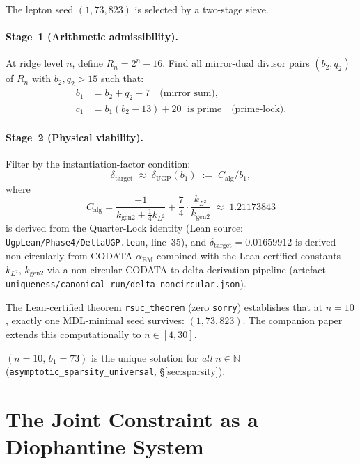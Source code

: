\documentclass[11pt]{article}
\theoremstyle{remark}
\newcommand{\bone}{b_1}
\newcommand{\btwo}{b_2}
\newcommand{\qtwo}{q_2}
\newcommand{\cone}{c_1}
\newcommand{\deltaNUGP}{\delta_{\mathrm{UGP}}}
\newcommand{\deltatar}{\delta_{\mathrm{target}}}
\newcommand{\Calg}{C_{\mathrm{alg}}}
\begin{document}
The lepton seed $(1, 73, 823)$ is selected by a two-stage sieve.

\paragraph{Stage~1 (Arithmetic admissibility).}
At ridge level $n$, define $R_n = 2^n - 16$.
Find all mirror-dual divisor pairs $(\btwo, \qtwo)$ of $R_n$ with $\btwo, \qtwo > 15$ such that:
\begin{align}
  \bone &= \btwo + \qtwo + 7 \quad \text{(mirror sum)}, \label{eq:s1_mirror} \\
  \cone &= \bone(\btwo - 13) + 20 \;\text{ is prime} \quad \text{(prime-lock)}. \label{eq:s1_prime}
\end{align}

\paragraph{Stage~2 (Physical viability).}
Filter by the instantiation-factor condition:
\begin{equation}
  \deltatar \;\approx\; \deltaNUGP(\bone) \;:=\; \Calg / \bone,
  \label{eq:delta_cond}
\end{equation}
where
\[
  \Calg = \frac{-1}{k_{\mathrm{gen2}} + \tfrac{1}{4}k_{L^2}}
         + \frac{7}{4}\cdot\frac{k_{L^2}}{k_{\mathrm{gen2}}}
         \;\approx\; 1.21173843
\]
is derived from the Quarter-Lock identity (Lean source:
\texttt{UgpLean/Phase4/DeltaUGP.lean}, line~35), and $\deltatar = 0.01659912$ is derived
non-circularly from CODATA $\alpha_{\mathrm{EM}}$ combined with the Lean-certified
constants $k_{L^2}$, $k_{\mathrm{gen2}}$ via a non-circular CODATA-to-delta derivation pipeline (artefact
\texttt{uniqueness/canonical\_run/\allowbreak delta\_noncircular.json}).

The Lean-certified theorem \texttt{rsuc\_theorem} (zero \texttt{sorry}) establishes
that at $n{=}10$, exactly one MDL-minimal seed survives: $(1, 73, 823)$.
The companion paper~\cite{SpivackUnifiedRigidity} extends this computationally to
$n \in [4,30]$.

$(n{=}10,\,\bone{=}73)$ is the unique solution for \emph{all}
$n \in \mathbb{N}$ (\texttt{asymptotic\_sparsity\_universal}, \S\ref{sec:sparsity}).

\section{The Joint Constraint as a Diophantine System}
\label{sec:diophantine}
\end{document}
